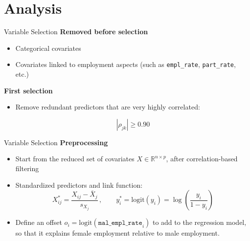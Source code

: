 \section{Analysis} 

\begin{frame}{Variable Selection}
\vspace{0.5 cm}
        \textbf{Removed before selection}
        \begin{itemize}
            \item Categorical covariates
            \item Covariates linked to employment aspects (such as \texttt{empl\_rate}, \texttt{part\_rate}, etc.)
        \end{itemize}
        \textbf{First selection} \\
        
        \begin{itemize}
            \item Remove redundant predictors that are very highly correlated:

            \[
                |\rho_{jk}| \ge 0.90
            \]
        \end{itemize}
\end{frame}


\begin{frame}{Variable Selection}
\textbf{Preprocessing}
    \begin{itemize}
        \item Start from the reduced set of covariates $X \in \mathbb{R}^{n \times p}$, after correlation-based filtering
        \item Standardized predictors and link function:
        \[
            X^{\ast}_{ij} = \frac{X_{ij} - \bar{X}_j}{s_{X_j}} \, , 
            \qquad
            y^{\ast}_i = \text{logit}(y_i) = \log\!\left( \frac{y_i}{1 - y_i} \right)
        \]

        \item Define an offset $o_i=\text{logit}(\texttt{mal\_empl\_rate}_i)$ to add to the regression model, so that it explains female employment relative to male employment.
    \end{itemize}
\end{frame}


